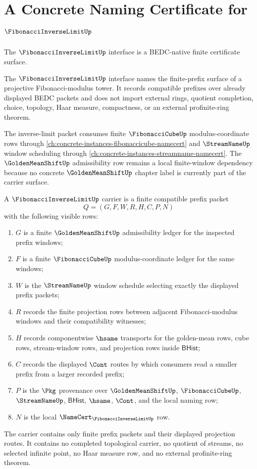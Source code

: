 \chapter{A Concrete Naming Certificate for $\FibonacciInverseLimitUp$}
\label{ch:concrete-instances-fibonacci-inverse-limit-namecert}

The $\FibonacciInverseLimitUp$ interface is a BEDC-native finite certificate surface.

The $\FibonacciInverseLimitUp$ interface names the finite-prefix surface of a projective Fibonacci-modulus tower. It records compatible prefixes over already displayed BEDC packets and does not import external rings, quotient completion, choice, topology, Haar measure, compactness, or an external profinite-ring theorem.

The inverse-limit packet consumes finite $\FibonacciCubeUp$ modulus-coordinate rows through \autoref{ch:concrete-instances-fibonaccicube-namecert} and $\StreamNameUp$ window scheduling through \autoref{ch:concrete-instances-streamname-namecert}. The $\GoldenMeanShiftUp$ admissibility row remains a local finite-window dependency because no concrete $\GoldenMeanShiftUp$ chapter label is currently part of the carrier surface.

\begin{definition}
\label{def:fibonacci-inverse-limit-carrier}
A $\FibonacciInverseLimitUp$ carrier is a finite compatible prefix packet
$$
Q=(G,F,W,R,H,C,P,N)
$$
with the following visible rows:
\begin{enumerate}
\item $G$ is a finite $\GoldenMeanShiftUp$ admissibility ledger for the inspected prefix windows;
\item $F$ is a finite $\FibonacciCubeUp$ modulus-coordinate ledger for the same windows;
\item $W$ is the $\StreamNameUp$ window schedule selecting exactly the displayed prefix packets;
\item $R$ records the finite projection rows between adjacent Fibonacci-modulus windows and their compatibility witnesses;
\item $H$ records componentwise $\hsame$ transports for the golden-mean rows, cube rows, stream-window rows, and projection rows inside $\mathsf{BHist}$;
\item $C$ records the displayed $\Cont$ routes by which consumers read a smaller prefix from a larger recorded prefix;
\item $P$ is the $\Pkg$ provenance over $\GoldenMeanShiftUp$, $\FibonacciCubeUp$, $\StreamNameUp$, $\mathsf{BHist}$, $\hsame$, $\Cont$, and the local naming row;
\item $N$ is the local $\NameCert_{\FibonacciInverseLimitUp}$ row.
\end{enumerate}
The carrier contains only finite prefix packets and their displayed projection routes. It contains no completed topological carrier, no quotient of streams, no selected infinite point, no Haar measure row, and no external profinite-ring theorem.
\end{definition}

